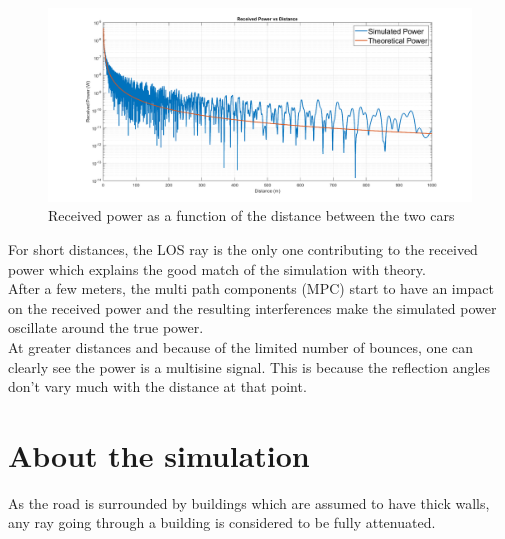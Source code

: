 \documentclass[10pt,a4paper]{ULBreport}
\begin{document}
\begin{figure}[H]
    \centering
    \includegraphics[width=1\textwidth]{3_3.png}
    \caption{Received power as a function of the distance between the two cars}
    \label{fig:P_RX(d)}
\end{figure}

For short distances, the LOS ray is the only one contributing to the received power which explains the good match of the simulation with theory. \\
After a few meters, the multi path components (MPC) start to have an impact on the received power and the resulting interferences make the simulated power oscillate around the true power. \\
At greater distances and because of the limited number of bounces, one can clearly see the power is a multisine signal. This is because the reflection angles don't vary much with the distance at that point.

\section{About the simulation}

As the road is surrounded by buildings which are assumed to have thick walls, any ray going through a building is considered to be fully attenuated.



\end{document}
